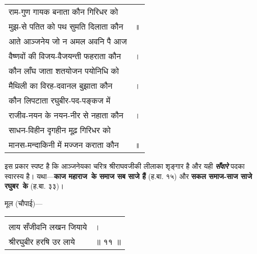 {\begin{longtable}[l]{@{\hspace*{\mylen}}>{\setlength\parfillskip{0pt}}p{\mylenone}@{}@{}l@{}}
राम-गुण गायक बनाता कौन गिरिधर को & \\ \nopagebreak
मुझ-से पतित को पथ सुमति दिलाता कौन & ॥\\
आते आञ्जनेय जो न अमल अवनि पै आज & \\ \nopagebreak
वैष्णवों की विजय-वैजयन्ती फहराता कौन & ।\\
कौन लाँघ जाता शतयोजन पयोनिधि को & \\ \nopagebreak
मैथिली का विरह-दवानल बुझाता कौन & ।\\
कौन लिपटाता रघुबीर-पद-पङ्कज में & \\ \nopagebreak
राजीव-नयन के नयन-नीर से नहाता कौन & ।\\
साधन-विहीन दृगहीन मूढ़ गिरिधर को & \\ \nopagebreak
मानस-मन्दाकिनी में मज्जन कराता कौन & ॥\\
\end{longtable}
}
\pagebreak

\begin{sloppypar}\justifying{}
\noindent इस प्रकार स्पष्ट है कि आञ्जनेयका चरित्र श्रीराघवजीकी लीलाका शृङ्गार है और यही \textbf{\textit{सँवारे}} पदका स्वारस्य है। यथा—\textbf{काज महाराज~के समाज सब साजे हैं} (ह.बा. १५) और \textbf{सकल समाज-साज साजे रघुबर~के} (ह.बा. ३३)।
\end{sloppypar}
\paraseplotus
\pagebreak


{}
\begin{sloppypar}\justifying{}
मूल (चौपाई)—
\end{sloppypar}

{\bfseries{}
\setlength{\mylenone}{0pt}
\settowidth{\mylentwo}{लाय सँजीवनि लखन जियाये}
\setlength{\mylenone}{\maxof{\mylenone}{\mylentwo}}
\settowidth{\mylentwo}{श्रीरघुबीर हरषि उर लाये}
\setlength{\mylenone}{\maxof{\mylenone}{\mylentwo}}
\setlength{\mylentwo}{\baselineskip}
\setlength{\mylenone}{\mylenone + 1pt}
\begin{longtable}[l]{@{\hspace*{\mylen}}>{\setlength\parfillskip{0pt}}p{\mylenone}@{}@{}l@{}}
 & \\[-\the\mylentwo]
लाय सँजीवनि लखन जियाये & ।\\ \nopagebreak[1mm]
श्रीरघुबीर हरषि उर लाये & ॥ ११ ॥
\end{longtable}
}

